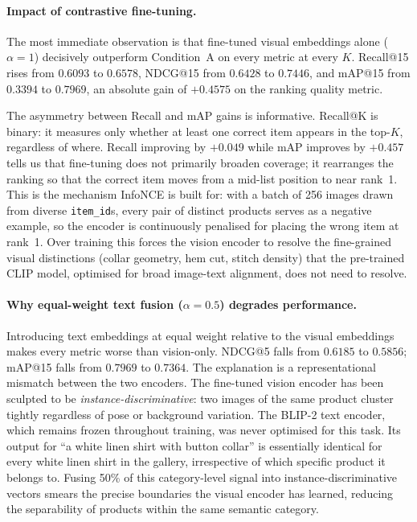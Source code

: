 \documentclass[12pt,a4paper]{article}
\begin{document}
\paragraph{Impact of contrastive fine-tuning.}
The most immediate observation is that fine-tuned visual embeddings alone
($\alpha=1$) decisively outperform Condition~A on every metric at every $K$.
Recall@15 rises from $0.6093$ to $0.6578$, NDCG@15 from $0.6428$ to
$0.7446$, and mAP@15 from $0.3394$ to $0.7969$, an absolute gain of
$+0.4575$ on the ranking quality metric.

The asymmetry between Recall and mAP gains is informative.
Recall@K is binary: it measures only whether at least one correct item
appears in the top-$K$, regardless of where.
Recall improving by $+0.049$ while mAP improves by $+0.457$ tells us
that fine-tuning does not primarily broaden coverage; it 
rearranges the ranking so that the correct item moves from a mid-list
position to near rank~1.
This is the mechanism InfoNCE is built for: with a batch of 256 images
drawn from diverse \texttt{item\_id}s, every pair of distinct products
serves as a negative example, so the encoder is continuously penalised
for placing the wrong item at rank~1.
Over training this forces the vision encoder to resolve the fine-grained
visual distinctions (collar geometry, hem cut, stitch density) that the
pre-trained CLIP model, optimised for broad image-text alignment,
does not need to resolve.

\paragraph{Why equal-weight text fusion ($\alpha=0.5$) degrades performance.}
Introducing text embeddings at equal weight relative to the visual
embeddings makes every metric worse than vision-only.
NDCG@5 falls from $0.6185$ to $0.5856$; mAP@15 falls from $0.7969$ to
$0.7364$.
The explanation is a representational mismatch between the two encoders.
The fine-tuned vision encoder has been sculpted to be
\emph{instance-discriminative}: two images of the same product cluster
tightly regardless of pose or background variation.
The BLIP-2 text encoder, which remains frozen throughout training, was
never optimised for this task.
Its output for ``a white linen shirt with button collar'' is essentially
identical for every white linen shirt in the gallery, irrespective of
which specific product it belongs to.
Fusing 50\% of this category-level signal into instance-discriminative
vectors smears the precise boundaries the visual encoder has learned,
reducing the separability of products within the same semantic category.
\end{document}
